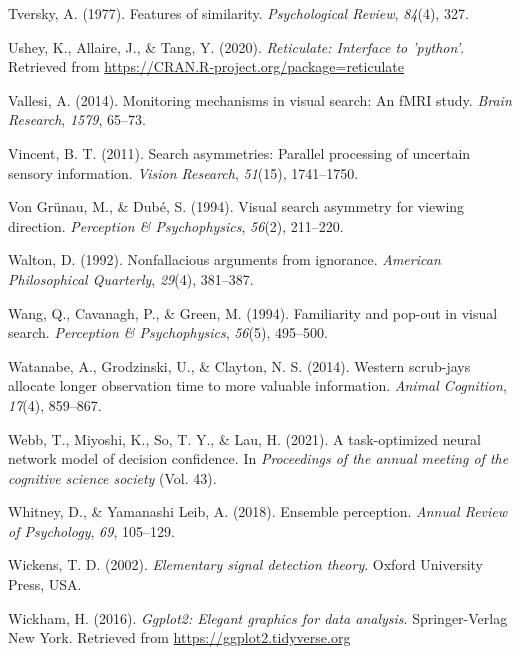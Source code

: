 \documentclass[12pt,twoside]{reedthesis}
\begin{document}
\leavevmode\hypertarget{ref-tversky1977features}{}%
Tversky, A. (1977). Features of similarity. \emph{Psychological Review}, \emph{84}(4), 327.

\leavevmode\hypertarget{ref-R-reticulate}{}%
Ushey, K., Allaire, J., \& Tang, Y. (2020). \emph{Reticulate: Interface to 'python'}. Retrieved from \url{https://CRAN.R-project.org/package=reticulate}

\leavevmode\hypertarget{ref-vallesi2014monitoring}{}%
Vallesi, A. (2014). Monitoring mechanisms in visual search: An fMRI study. \emph{Brain Research}, \emph{1579}, 65--73.

\leavevmode\hypertarget{ref-vincent2011search}{}%
Vincent, B. T. (2011). Search asymmetries: Parallel processing of uncertain sensory information. \emph{Vision Research}, \emph{51}(15), 1741--1750.

\leavevmode\hypertarget{ref-von1994visual}{}%
Von Grünau, M., \& Dubé, S. (1994). Visual search asymmetry for viewing direction. \emph{Perception \& Psychophysics}, \emph{56}(2), 211--220.

\leavevmode\hypertarget{ref-walton1992nonfallacious}{}%
Walton, D. (1992). Nonfallacious arguments from ignorance. \emph{American Philosophical Quarterly}, \emph{29}(4), 381--387.

\leavevmode\hypertarget{ref-wang1994familiarity}{}%
Wang, Q., Cavanagh, P., \& Green, M. (1994). Familiarity and pop-out in visual search. \emph{Perception \& Psychophysics}, \emph{56}(5), 495--500.

\leavevmode\hypertarget{ref-watanabe2014western}{}%
Watanabe, A., Grodzinski, U., \& Clayton, N. S. (2014). Western scrub-jays allocate longer observation time to more valuable information. \emph{Animal Cognition}, \emph{17}(4), 859--867.

\leavevmode\hypertarget{ref-webb2021task}{}%
Webb, T., Miyoshi, K., So, T. Y., \& Lau, H. (2021). A task-optimized neural network model of decision confidence. In \emph{Proceedings of the annual meeting of the cognitive science society} (Vol. 43).

\leavevmode\hypertarget{ref-whitney2018ensemble}{}%
Whitney, D., \& Yamanashi Leib, A. (2018). Ensemble perception. \emph{Annual Review of Psychology}, \emph{69}, 105--129.

\leavevmode\hypertarget{ref-wickens2002elementary}{}%
Wickens, T. D. (2002). \emph{Elementary signal detection theory}. Oxford University Press, USA.

\leavevmode\hypertarget{ref-R-ggplot2}{}%
Wickham, H. (2016). \emph{Ggplot2: Elegant graphics for data analysis}. Springer-Verlag New York. Retrieved from \url{https://ggplot2.tidyverse.org}
\end{document}
